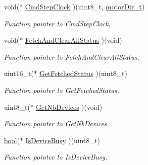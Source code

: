 \begin{DoxyCompactItemize}
\mbox{\label{structmotor_drv__t_af6cf382357f24a2675a779aaf2e3015d}} 
void($\ast$ \mbox{\hyperlink{structmotor_drv__t_af6cf382357f24a2675a779aaf2e3015d}{Cmd\+Step\+Clock}} )(uint8\+\_\+t, \mbox{\hyperlink{group___device___direction___options_ga4eaf4196e4d11d552f58f3fab218a8c7}{motor\+Dir\+\_\+t}})
\begin{DoxyCompactList}\small\item\em Function pointer to Cmd\+Step\+Clock. \end{DoxyCompactList}\item 
\mbox{\label{structmotor_drv__t_a9a47e0ccf16954bf28d4e9829326929a}} 
void($\ast$ \mbox{\hyperlink{structmotor_drv__t_a9a47e0ccf16954bf28d4e9829326929a}{Fetch\+And\+Clear\+All\+Status}} )(void)
\begin{DoxyCompactList}\small\item\em Function pointer to Fetch\+And\+Clear\+All\+Status. \end{DoxyCompactList}\item 
\mbox{\label{structmotor_drv__t_a86abc9f7d69a66d234d3f9f748109c3d}} 
uint16\+\_\+t($\ast$ \mbox{\hyperlink{structmotor_drv__t_a86abc9f7d69a66d234d3f9f748109c3d}{Get\+Fetched\+Status}} )(uint8\+\_\+t)
\begin{DoxyCompactList}\small\item\em Function pointer to Get\+Fetched\+Status. \end{DoxyCompactList}\item 
\mbox{\label{structmotor_drv__t_a2b2d47e96d62f7efb11fcc32dadce6f4}} 
uint8\+\_\+t($\ast$ \mbox{\hyperlink{structmotor_drv__t_a2b2d47e96d62f7efb11fcc32dadce6f4}{Get\+Nb\+Devices}} )(void)
\begin{DoxyCompactList}\small\item\em Function pointer to Get\+Nb\+Devices. \end{DoxyCompactList}\item 
\mbox{\label{structmotor_drv__t_a63d40db18bc1c48c596ac03d7cea0810}} 
\mbox{\hyperlink{group___motor___boolean___type_ga0ecf26b576b9a54eca656b9be7ba6a06}{bool}}($\ast$ \mbox{\hyperlink{structmotor_drv__t_a63d40db18bc1c48c596ac03d7cea0810}{Is\+Device\+Busy}} )(uint8\+\_\+t)
\begin{DoxyCompactList}\small\item\em Function pointer to Is\+Device\+Busy. \end{DoxyCompactList}\item 

\end{DoxyCompactItemize}
